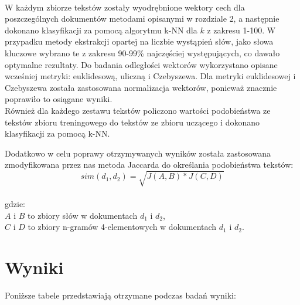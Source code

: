 \documentclass{classrep}
\begin{document}
\paragraph{}
W każdym zbiorze tekstów zostały wyodrębnione wektory cech dla poszczególnych dokumentów metodami opisanymi w rozdziale 2, a następnie dokonano klasyfikacji za pomocą algorytmu k-NN dla $k$ z zakresu 1-100. W przypadku metody ekstrakcji opartej na liczbie wystąpień słów, jako słowa kluczowe wybrano te z zakresu 90-99\% najczęściej występujących, co dawało optymalne rezultaty.
Do badania odległości wektorów wykorzystano opisane wcześniej metryki: euklidesową, uliczną i Czebyszewa. Dla metryki euklidesowej i Czebyszewa została zastosowana normalizacja wektorów, ponieważ znacznie poprawiło to osiągane wyniki.\\
Również dla każdego zestawu tekstów policzono wartości podobieństwa ze tekstów zbioru treningowego do tekstów ze zbioru uczącego i dokonano klasyfikacji za pomocą k-NN.

Dodatkowo w celu poprawy otrzymywanych wyników została zastosowana zmodyfikowana przez nas metoda Jaccarda do określania podobieństwa tekstów: $$sim(d_1, d_2) = \sqrt{J(A ,B)*J(C, D)}$$\\
gdzie:\\
$A$ i $B$ to zbiory słów w dokumentach $d_1$ i $d_2$,\\
$C$ i $D$ to zbiory n-gramów 4-elementowych w dokumentach $d_1$ i $d_2$.


\section{Wyniki}
Poniższe tabele przedstawiają otrzymane podczas badań wyniki:

\end{document}
